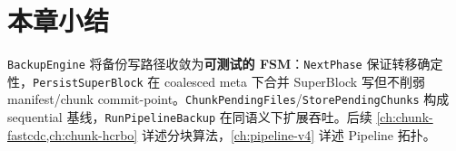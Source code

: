 \section{本章小结}

\texttt{BackupEngine} 将备份写路径收敛为\textbf{可测试的 FSM}：\texttt{NextPhase} 保证转移确定性，\texttt{PersistSuperBlock} 在 coalesced meta 下合并 SuperBlock 写但不削弱 manifest/chunk commit-point。\texttt{ChunkPendingFiles}/\texttt{StorePendingChunks} 构成 sequential 基线，\texttt{RunPipelineBackup} 在同语义下扩展吞吐。后续 \cref{ch:chunk-fastcdc,ch:chunk-hcrbo} 详述分块算法，\cref{ch:pipeline-v4} 详述 Pipeline 拓扑。
